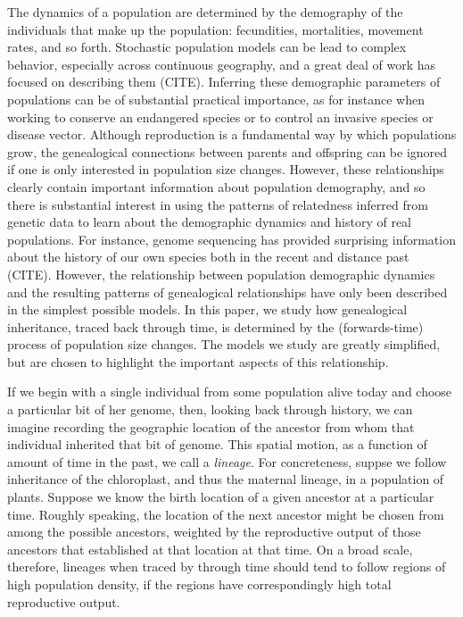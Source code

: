 \documentclass{article}
\begin{document}
The dynamics of a population 
are determined by the demography of the individuals that make up the population:
fecundities, mortalities, movement rates, and so forth.
Stochastic population models can be lead to complex behavior,
especially across continuous geography,
and a great deal of work has focused on describing them (CITE).
Inferring these demographic parameters of populations
can be of substantial practical importance,
as for instance when working to conserve an endangered species
or to control an invasive species or disease vector.
Although reproduction is a fundamental way by which populations grow,
the genealogical connections between parents and offspring can be ignored
if one is only interested in population size changes.
However, these relationships clearly contain important information about population demography,
and so there is substantial interest in using the patterns of relatedness inferred from genetic data
to learn about the demographic dynamics and history of real populations.
For instance, genome sequencing has provided surprising information about the history of our own species
both in the recent and distance past (CITE).
However, the relationship between population demographic dynamics
and the resulting patterns of genealogical relationships have only been described
in the simplest possible models.
In this paper, we study how genealogical inheritance, traced back through time,
is determined by the (forwards-time) process of population size changes.
The models we study are greatly simplified,
but are chosen to highlight the important aspects of this relationship.

If we begin with a single individual from some population alive today 
and choose a particular bit of her genome,
then, looking back through history, 
we can imagine recording the geographic location of the ancestor from whom that individual
inherited that bit of genome.
This spatial motion, as a function of amount of time in the past,
we call a \emph{lineage}.
For concreteness, suppse we follow inheritance of the chloroplast,
and thus the maternal lineage, in a population of plants.
Suppose we know the birth location of a given ancestor at a particular time.
Roughly speaking, the location of the next ancestor might be chosen from among the possible ancestors,
weighted by the reproductive output of those ancestors that established at that location
at that time.
On a broad scale, therefore,
lineages when traced by through time should tend to follow regions of high population density,
if the regions have correspondingly high total reproductive output.
\end{document}
